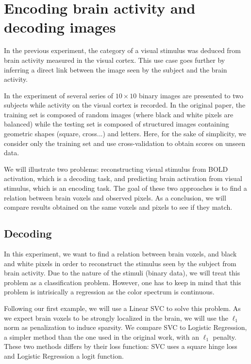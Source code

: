 \documentclass{frontiersSCNS} %
\begin{document}
\section{Encoding brain activity and decoding images}
\label{kamitani}

In the previous experiment, the category of a visual stimulus was deduced from
brain activity measured in the visual cortex.
This use case goes further by inferring a direct link between the image
seen by the subject and the brain activity.

In the experiment of \cite{miyawaki2008} several series of $10{\times}10$
binary images are presented to two subjects while activity on the visual cortex
is recorded.
In the original paper, the training set is composed of random images (where black and white pixels
are balanced) while the testing set is composed of structured images containing
geometric shapes (square, cross...) and letters. Here, for the sake of simplicity, we consider only the training set and use cross-validation to
obtain scores on unseen data.

We will illustrate two problems: reconstructing visual stimulus from BOLD activation,
which is a decoding task, and predicting brain activation from visual
stimulus, which is an encoding task. The goal of these two approaches is to find
a relation between brain voxels and observed pixels. As a conclusion, we will
compare results obtained on the same voxels and pixels to see if they match.

\subsection{Decoding}

In this experiment, we want to find a relation between brain voxels,
and black and white pixels in order to reconstruct the stimulus seen by the
subject from brain activity. Due to the nature of the stimuli (binary data), we
will treat this problem as a classification problem. However, one has to keep in
mind that this problem is intrisically a regression as the color spectrum is
continuous.

Following our first example, we will use a Linear SVC to solve this problem.
As we expect brain voxels to be strongly localized in the brain, we will use the
$\ell_1$ norm as penalization to induce sparsity. We compare SVC to Logistic
Regression, a simpler method than the one used in the original work, with an $\ell_1$ penalty.
These two methods differs by their loss function: SVC uses a square hinge loss
and Logistic Regression a logit function.
\end{document}
